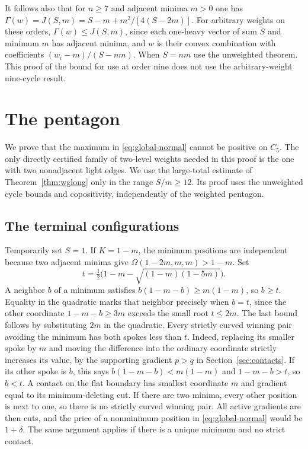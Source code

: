 \documentclass[11pt,a4paper]{article}
\theoremstyle{definition}
\begin{document}
It follows also that for $n\ge7$ and adjacent minima $m>0$ one has
$\Gamma(w)=J(S,m)=S-m+m^2/[4(S-2m)]$. For arbitrary weights on
these orders, $\Gamma(w)\le J(S,m)$, since each one-heavy vector of sum
$S$ and minimum $m$ has adjacent minima, and $w$ is their convex
combination with coefficients $(w_i-m)/(S-nm)$. When $S=nm$ use
the unweighted theorem. This proof of the bound for use at order nine
does not use the arbitrary-weight nine-cycle result.

\section{The pentagon}\label{sec:five}

We prove that the maximum in \eqref{eq:global-normal} cannot be positive
on $C_5$. The only directly certified family of two-level weights needed
in this proof is the one with two nonadjacent light edges. We use the
large-total estimate of Theorem~\ref{thm:wglong} only
in the range $S/m\ge12$. Its proof uses the unweighted cycle bounds and
copositivity, independently of the weighted pentagon.

\subsection{The terminal configurations}

Temporarily set $S=1$. If $K=1-m$, the minimum positions are independent because
two adjacent minima give $\Omega(1-2m,m,m)>1-m$. Set
\[
 t=\tfrac12\big(1-m-\sqrt{(1-m)(1-5m)}\big).
\]
A neighbor $b$ of a minimum satisfies $b(1-m-b)\ge m(1-m)$, so $b\ge t$.
Equality in the quadratic marks that neighbor precisely when $b=t$, since
the other coordinate $1-m-b\ge3m$ exceeds the small root $t\le2m$.
The last bound follows by substituting $2m$ in the quadratic.
Every strictly curved winning pair avoiding the minimum has both spokes
less than $t$. Indeed, replacing its smaller spoke by $m$ and moving the
difference into the ordinary coordinate strictly increases its value,
by the supporting gradient $p>q$ in Section~\ref{sec:contacts}. If its
other spoke is $b$, this says $b(1-m-b)<m(1-m)$ and $1-m-b>t$, so $b<t$.
A contact on the flat boundary has smallest coordinate $m$ and gradient
equal to its minimum-deleting cut. If there are two minima, every other
position is next to one, so there is no strictly curved winning pair.
All active gradients are then cuts, and the price of a nonminimum position
in \eqref{eq:global-normal} would be $1+\delta$. The same argument applies
if there is a unique minimum and no strict contact.
\end{document}
